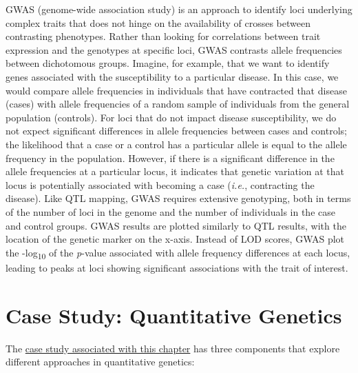 \documentclass[
]{book}
\begin{document}
GWAS (genome-wide association study) is an approach to identify loci underlying complex traits that does not hinge on the availability of crosses between contrasting phenotypes. Rather than looking for correlations between trait expression and the genotypes at specific loci, GWAS contrasts allele frequencies between dichotomous groups. Imagine, for example, that we want to identify genes associated with the susceptibility to a particular disease. In this case, we would compare allele frequencies in individuals that have contracted that disease (cases) with allele frequencies of a random sample of individuals from the general population (controls). For loci that do not impact disease susceptibility, we do not expect significant differences in allele frequencies between cases and controls; the likelihood that a case or a control has a particular allele is equal to the allele frequency in the population. However, if there is a significant difference in the allele frequencies at a particular locus, it indicates that genetic variation at that locus is potentially associated with becoming a case (\emph{i.e.}, contracting the disease). Like QTL mapping, GWAS requires extensive genotyping, both in terms of the number of loci in the genome and the number of individuals in the case and control groups. GWAS results are plotted similarly to QTL results, with the location of the genetic marker on the x-axis. Instead of LOD scores, GWAS plot the -log\textsubscript{10} of the \emph{p}-value associated with allele frequency differences at each locus, leading to peaks at loci showing significant associations with the trait of interest.

\hypertarget{case-study-quantitative-genetics}{%
\section{Case Study: Quantitative Genetics}\label{case-study-quantitative-genetics}}

The \href{exercises/BIOL520-ex7.zip}{case study associated with this chapter} has three components that explore different approaches in quantitative genetics:
\end{document}
